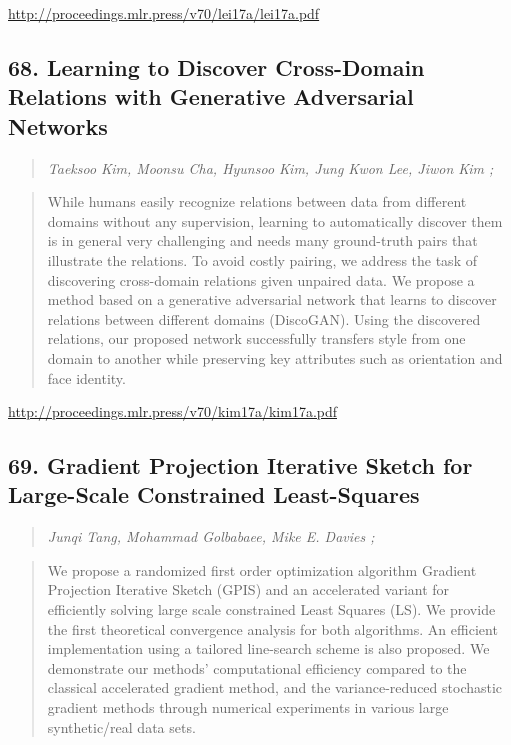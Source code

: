 \documentclass{article}
\begin{document}
\href{http://proceedings.mlr.press/v70/lei17a/lei17a.pdf}{http://proceedings.mlr.press/v70/lei17a/lei17a.pdf}

\subsection{68. Learning to Discover Cross-Domain Relations with Generative Adversarial Networks}

\begin{quote}
\footnotesize{\textit{Taeksoo Kim, Moonsu Cha, Hyunsoo Kim, Jung Kwon Lee, Jiwon Kim ;}}
\end{quote}

\begin{quote}
    While humans easily recognize relations between data from different domains without any supervision, learning to automatically discover them is in general very challenging and needs many ground-truth pairs that illustrate the relations. To avoid costly pairing, we address the task of discovering cross-domain relations given unpaired data. We propose a method based on a generative adversarial network that learns to discover relations between different domains (DiscoGAN). Using the discovered relations, our proposed network successfully transfers style from one domain to another while preserving key attributes such as orientation and face identity.  \end{quote}

\href{http://proceedings.mlr.press/v70/kim17a/kim17a.pdf}{http://proceedings.mlr.press/v70/kim17a/kim17a.pdf}

\subsection{69. Gradient Projection Iterative Sketch for Large-Scale Constrained Least-Squares}

\begin{quote}
\footnotesize{\textit{Junqi Tang, Mohammad Golbabaee, Mike E. Davies ;}}
\end{quote}

\begin{quote}
    We propose a randomized first order optimization algorithm Gradient Projection Iterative Sketch (GPIS) and an accelerated variant for efficiently solving large scale constrained Least Squares (LS). We provide the first theoretical convergence analysis for both algorithms. An efficient implementation using a tailored line-search scheme is also proposed. We demonstrate our methods’ computational efficiency compared to the classical accelerated gradient method, and the variance-reduced stochastic gradient methods through numerical experiments in various large synthetic/real data sets.  \end{quote}
\end{document}
